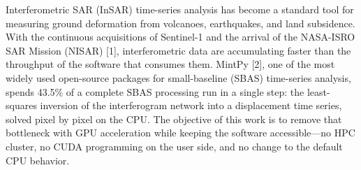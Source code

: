 \documentclass[a4paper]{article}
\begin{document}



Interferometric SAR (InSAR) time-series analysis has become a standard tool
for measuring ground deformation from volcanoes, earthquakes, and land subsidence.
With the continuous acquisitions of Sentinel-1
and the arrival of the NASA-ISRO SAR Mission (NISAR) [1],
interferometric data are accumulating faster
than the throughput of the software that consumes them.
MintPy [2], one of the most widely used open-source packages
for small-baseline (SBAS) time-series analysis,
spends 43.5\% of a complete SBAS processing run in a single step:
the least-squares inversion of the interferogram network into a displacement
time series, solved pixel by pixel on the CPU.
The objective of this work is to remove that bottleneck with GPU acceleration
while keeping the software accessible---no HPC cluster,
no CUDA programming on the user side,
and no change to the default CPU behavior.
\end{document}
